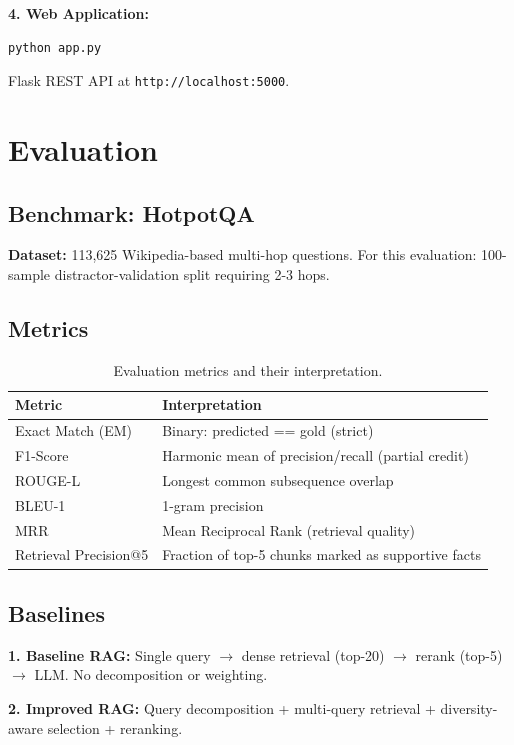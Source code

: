 \documentclass[twocolumn,11pt]{article}
\begin{document}
\textbf{4. Web Application:}
\begin{verbatim}
python app.py
\end{verbatim}
Flask REST API at \texttt{http://localhost:5000}.

\section{Evaluation}

\subsection{Benchmark: HotpotQA}

\textbf{Dataset:} 113,625 Wikipedia-based multi-hop questions. For this evaluation: 100-sample distractor-validation split requiring 2-3 hops.

\subsection{Metrics}

\begin{table}[H]
\centering
\small
\begin{tabular}{|l|p{4.5cm}|}
\hline
\textbf{Metric} & \textbf{Interpretation} \\
\hline
Exact Match (EM) & Binary: predicted == gold (strict) \\
F1-Score & Harmonic mean of precision/recall (partial credit) \\
ROUGE-L & Longest common subsequence overlap \\
BLEU-1 & 1-gram precision \\
MRR & Mean Reciprocal Rank (retrieval quality) \\
Retrieval Precision@5 & Fraction of top-5 chunks marked as supportive facts \\
\hline
\end{tabular}
\caption{Evaluation metrics and their interpretation.}
\label{tab:metrics}
\end{table}

\subsection{Baselines}

\textbf{1. Baseline RAG:} Single query $\rightarrow$ dense retrieval (top-20) $\rightarrow$ rerank (top-5) $\rightarrow$ LLM. No decomposition or weighting.

\textbf{2. Improved RAG:} Query decomposition + multi-query retrieval + diversity-aware selection + reranking.
\end{document}
